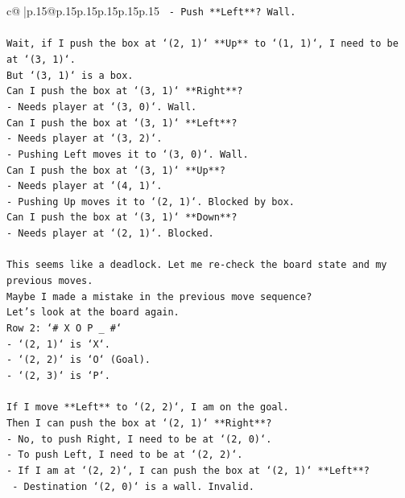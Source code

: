 \documentclass{article}
\begin{document}
{\begin{supertabular}{c@{$\;$}|p{.15\linewidth}@{}p{.15\linewidth}p{.15\linewidth}p{.15\linewidth}p{.15\linewidth}p{.15\linewidth}}
{{{\texttt{    {-} Push **Left**? Wall.} \\
\\ 
\texttt{Wait, if I push the box at `(2, 1)` **Up** to `(1, 1)`, I need to be at `(3, 1)`.} \\
\texttt{But `(3, 1)` is a box.} \\
\texttt{Can I push the box at `(3, 1)` **Right**?} \\
\texttt{{-} Needs player at `(3, 0)`. Wall.} \\
\texttt{Can I push the box at `(3, 1)` **Left**?} \\
\texttt{{-} Needs player at `(3, 2)`.} \\
\texttt{{-} Pushing Left moves it to `(3, 0)`. Wall.} \\
\texttt{Can I push the box at `(3, 1)` **Up**?} \\
\texttt{{-} Needs player at `(4, 1)`.} \\
\texttt{{-} Pushing Up moves it to `(2, 1)`. Blocked by box.} \\
\texttt{Can I push the box at `(3, 1)` **Down**?} \\
\texttt{{-} Needs player at `(2, 1)`. Blocked.} \\
\\ 
\texttt{This seems like a deadlock. Let me re{-}check the board state and my previous moves.} \\
\texttt{Maybe I made a mistake in the previous move sequence?} \\
\texttt{Let's look at the board again.} \\
\texttt{Row 2: `\# X O P \_ \#`} \\
\texttt{{-} `(2, 1)` is `X`.} \\
\texttt{{-} `(2, 2)` is `O` (Goal).} \\
\texttt{{-} `(2, 3)` is `P`.} \\
\\ 
\texttt{If I move **Left** to `(2, 2)`, I am on the goal.} \\
\texttt{Then I can push the box at `(2, 1)` **Right**?} \\
\texttt{{-} No, to push Right, I need to be at `(2, 0)`.} \\
\texttt{{-} To push Left, I need to be at `(2, 2)`.} \\
\texttt{{-} If I am at `(2, 2)`, I can push the box at `(2, 1)` **Left**?} \\
\texttt{  {-} Destination `(2, 0)` is a wall. Invalid.} \\
\\ 
}}}
\end{supertabular}}
\end{document}
